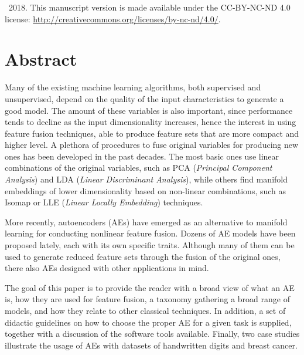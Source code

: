 \textcopyright\ 2018. This manuscript version is made available under the CC-BY-NC-ND 4.0 license: \url{http://creativecommons.org/licenses/by-nc-nd/4.0/}.

\section*{Abstract}
Many of the existing machine learning algorithms, both supervised and unsupervised, depend on the quality of the input characteristics to generate a good model. The amount of these variables is also important, since performance tends to decline as the input dimensionality increases, hence the interest in using feature fusion techniques, able to produce feature sets that are more compact and higher level. A plethora of procedures to fuse original variables for producing new ones has been developed in the past decades. The most basic ones use linear combinations of the original variables, such as PCA (\textit{Principal Component Analysis}) and LDA (\textit{Linear Discriminant Analysis}), while others find manifold embeddings of lower dimensionality based on non-linear combinations, such as Isomap or LLE (\textit{Linear Locally Embedding}) techniques. 

More recently, autoencoders (AEs) have emerged as an alternative to manifold learning for conducting nonlinear feature fusion. Dozens of AE models have been proposed lately, each with its own specific traits. Although many of them can be used to generate reduced feature sets through the fusion of the original ones, there also AEs designed with other applications in mind.

The goal of this paper is to provide the reader with a broad view of what an AE is, how they are used for feature fusion, a taxonomy gathering a broad range of models, and how they relate to other classical techniques. In addition, a set of didactic guidelines on how to choose the proper AE for a given task is supplied, together with a discussion of the software tools available. Finally, two case studies illustrate the usage of AEs with datasets of handwritten digits and breast cancer.



